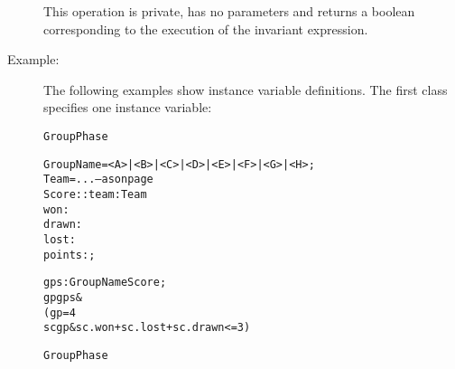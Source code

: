 \documentclass[\pformat,12pt]{article}
\begin{document}
\begin{description}
This operation is private, has no parameters and returns a boolean
corresponding to the execution of the invariant expression.

\item[Example:]

The following examples show instance variable definitions. The first
class specifies one instance variable: 
  \begin{alltt}
   GroupPhase


    GroupName = <A> | <B> | <C> | <D> | <E> | <F> | <G> | <H>;
    Team = ... -- as on page \pageref{scoredef}
    Score::team : Team
           won : 
           drawn : 
           lost : 
           points : ;


    gps :  GroupName  Score;
   gp  gps & 
        ( gp = 4 
          sc  gp & sc.won + sc.lost + sc.drawn <= 3)

   GroupPhase
  \end{alltt}


\end{description}
\end{document}
